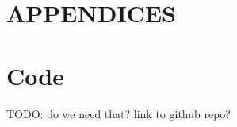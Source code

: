 \chapter*{APPENDICES}

\begingroup\let\clearpage\relax
\chapter{Code}
\label{chap:appendix_arb}
\endgroup

TODO: do we need that? link to github repo?